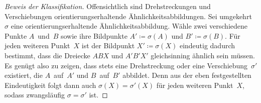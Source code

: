 \begin{proof}[Beweis der Klassifikation]
	Offensichtlich sind Drehstreckungen und Verschiebungen orientierungserhaltende Ähnlichkeitsabbildungen. Sei umgekehrt $\sigma$ eine orientierungserhaltende Ähnlichkeitsabbildung. Wähle zwei verschiedene Punkte $A$~und~$B$ sowie ihre Bildpunkte $A'\coloneqq \sigma(A)$ und $B'\coloneqq \sigma(B)$. Für jeden weiteren Punkt~$X$ ist der Bildpunkt $X'\coloneqq\sigma(X)$ eindeutig dadurch bestimmt, dass die Dreiecke $ABX$ und $A'B'X'$ gleichsinning ähnlich sein müssen. Es genügt also zu zeigen, dass stets eine Drehstreckung oder eine Verschiebung~$\sigma'$ existiert, die $A$~auf~$A'$ und $B$~auf~$B'$ abbildet. Denn aus der eben festgestellten Eindeutigkeit folgt dann auch $\sigma(X)=\sigma'(X)$ für jeden weiteren Punkt~$X$, sodass zwangsläufig $\sigma=\sigma'$ ist.
	

\end{proof}
